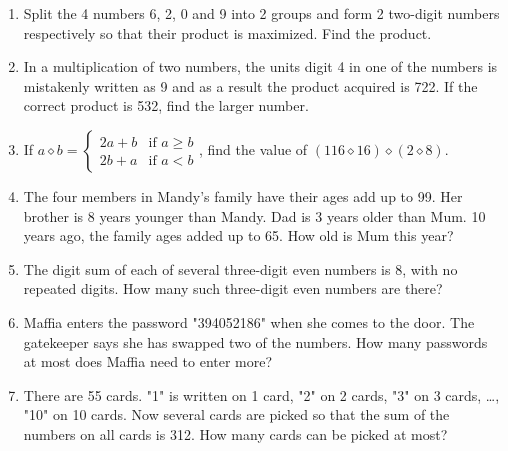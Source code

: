 \documentclass[11pt]{scrartcl}
\begin{document}
\begin{enumerate}
    \item Split the 4 numbers 6, 2, 0 and 9 into 2 groups and form 2 two-digit numbers respectively so that their product is maximized. Find the product.
    \item In a multiplication of two numbers, the units digit 4 in one of the numbers is mistakenly written as 9 and as a result the product acquired is 722. If the correct product is 532, find the larger number.
    \item If $a \diamond b = \begin{cases}
        2a + b & \text{if $a \geq b$} \\
        2b + a & \text{if $a < b$}
    \end{cases}$, find the value of $(116 \diamond 16) \diamond (2 \diamond 8)$.
    \item The four members in Mandy's family have their ages add up to 99. Her brother is 8 years younger than Mandy. Dad is 3 years older than Mum. 10 years ago, the family ages added up to 65. How old is Mum this year?
    \item The digit sum of each of several three-digit even numbers is 8, with no repeated digits. How many such three-digit even numbers are there?
    \item Maffia enters the password "394052186" when she comes to the door. The gatekeeper says she has swapped two of the numbers. How many passwords at most does Maffia need to enter more?
    \item There are 55 cards. "1" is written on 1 card, "2" on 2 cards, "3" on 3 cards, \ldots, "10" on 10 cards. Now several cards are picked so that the sum of the numbers on all cards is 312. How many cards can be picked at most?
\end{enumerate}
\end{document}
